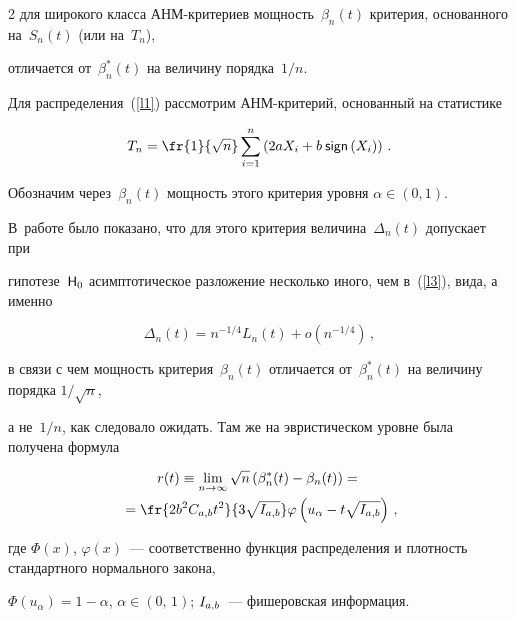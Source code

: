 \begin{multicols}{2}
для широкого класса АНМ-кри\-те\-ри\-ев мощность~$\beta_n(t)$ критерия, основанного на~$S_n(t)$ (или на~$T_n$), 


отличается от~$\beta_n^*(t)$ на величину порядка~$1/n$.





Для распределения~(\ref{l1}) рассмотрим АНМ-кри\-те\-рий, основанный на статистике


\begin{equation*}


T_n = \fr{1}{\sqrt{n}} \sum_{i = 1}^n\left(2aX_i + b\sign{X_i}\right)\,.




\end{equation*}


Обозначим через~$\beta_n(t)$ мощность этого критерия уровня $\alpha \in (0,1)$. 


В~работе \cite{article} было показано, что для этого критерия величина~$\Delta_n(t)$ допускает при 


гипотезе~${\sf H}_0$ асимптотическое разложение несколько иного, чем в~(\ref{l3}), вида, а именно


$$


\Delta_n(t) = n^{-1/4} L_n(t) +  o (n^{-1/4})\,,


$$


в связи с чем мощность критерия~$\beta_n(t)$ отличается от~$\beta_n^*(t)$ на величину порядка $1/\sqrt{n}$, 


а не~$1/n$, как следовало ожидать. Там же на эвристическом уровне была получена формула


\begin{multline}


r(t) \equiv \lim_{n \to \infty} \sqrt{n}\left(\beta_n^*(t) - \be_n(t)\right) = {}\\


{}=


\fr{2b^2\cab t^2}{3\sqrt{\iab}} \varphi\left(u_{\alpha} - t\sqrt{\iab}\right)\,,


\label{l5}


\end{multline}


где $\Phi(x)$, $\varphi(x)$~--- соответственно функция распределения и плотность стандартного нормального закона, 


$\Phi(u_{\alpha}) = 1 - \alpha$, $\alpha \in (0,\,1)$; $I_{a,b}$~--- фишеровская информация.






\end{multicols}
